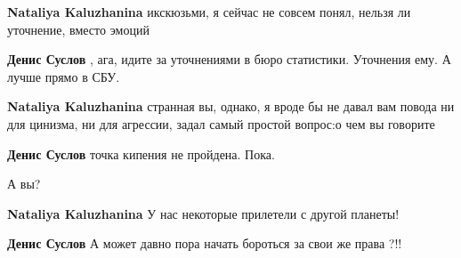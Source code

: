 \begin{itemize}
\begin{itemize}
\textbf{Nataliya Kaluzhanina} икскюзьми, я сейчас не совсем понял, нельзя ли уточнение, вместо эмоций

 
\textbf{Денис Суслов} , ага, идите за уточнениями в бюро статистики. Уточнения ему. А лучше прямо в СБУ.

 
\textbf{Nataliya Kaluzhanina} странная вы, однако, я вроде бы не давал вам повода ни для цинизма, ни для агрессии, задал самый простой вопрос:о чем вы говорите

 
\textbf{Денис Суслов} точка кипения не пройдена. Пока.

 
А вы?

 
\textbf{Nataliya Kaluzhanina} У нас некоторые прилетели с другой планеты!

 
\textbf{Денис Суслов} А может давно пора начать бороться за свои же права ?!!
\end{itemize}


\end{itemize}
